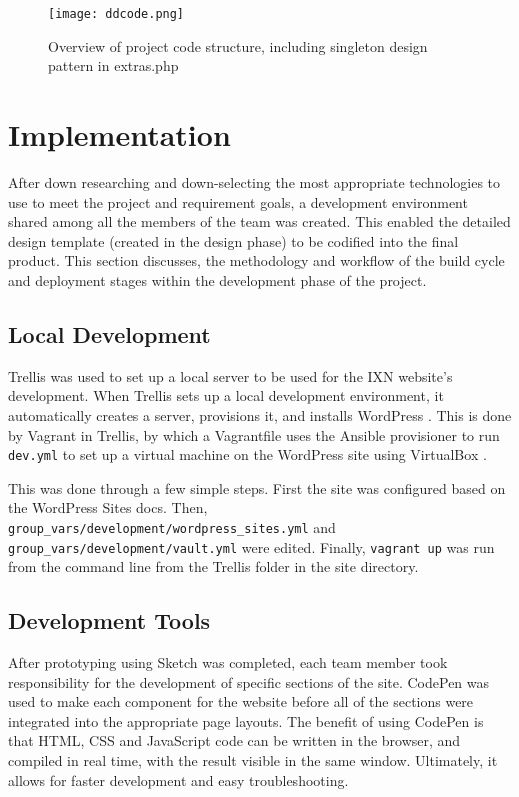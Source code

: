 \documentclass[fontsize=11pt]{extarticle}
\numberwithin{figure}{section} %
\begin{document}
\begin{figure}[H]
\centering
\texttt{[image: ddcode.png]}
\caption{Overview of project code structure, including singleton design pattern in extras.php}
\label{ddcode}
\end{figure}

\newpage

\hypertarget{implementation}{%
\section{Implementation}\label{implementation}}

After down researching and down-selecting the most appropriate
technologies to use to meet the project and requirement goals, a
development environment shared among all the members of the team was
created. This enabled the detailed design template (created in the
design phase) to be codified into the final product. This section
discusses, the methodology and workflow of the build cycle and
deployment stages within the development phase of the project.

\hypertarget{local-development}{%
\subsection{Local Development}\label{local-development}}

Trellis was used to set up a local server to be used for the IXN
website's development. When Trellis sets up a local development
environment, it automatically creates a server, provisions it, and
installs WordPress \cite{p21}. This is done by Vagrant in Trellis, by
which a Vagrantfile uses the Ansible provisioner to run \texttt{dev.yml}
to set up a virtual machine on the WordPress site using VirtualBox
\cite{p22} .

This was done through a few simple steps. First the site was configured
based on the WordPress Sites docs. Then,
\texttt{group\_vars/development/wordpress\_sites.yml} and
\texttt{group\_vars/development/vault.yml} were edited. Finally,
\texttt{vagrant\ up} was run from the command line from the Trellis
folder in the site directory.

\hypertarget{development-tools}{%
\subsection{Development Tools}\label{development-tools}}

After prototyping using Sketch was completed, each team member took
responsibility for the development of specific sections of the site.
CodePen was used to make each component for the website before all of
the sections were integrated into the appropriate page layouts. The
benefit of using CodePen is that HTML, CSS and JavaScript code can be
written in the browser, and compiled in real time, with the result
visible in the same window. \cite{p19} Ultimately, it allows for faster
development and easy troubleshooting.
\end{document}

